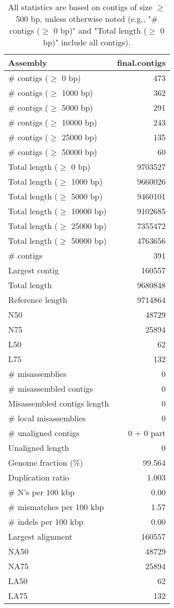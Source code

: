 \documentclass[12pt,a4paper]{article}
\begin{document}
\begin{table}[ht]
\begin{center}
\caption{All statistics are based on contigs of size $\geq$ 500 bp, unless otherwise noted (e.g., "\# contigs ($\geq$ 0 bp)" and "Total length ($\geq$ 0 bp)" include all contigs).}
\begin{tabular}{|l*{1}{|r}|}
\hline
Assembly & final.contigs \\ \hline
\# contigs ($\geq$ 0 bp) & 473 \\ \hline
\# contigs ($\geq$ 1000 bp) & 362 \\ \hline
\# contigs ($\geq$ 5000 bp) & 291 \\ \hline
\# contigs ($\geq$ 10000 bp) & 243 \\ \hline
\# contigs ($\geq$ 25000 bp) & 135 \\ \hline
\# contigs ($\geq$ 50000 bp) & 60 \\ \hline
Total length ($\geq$ 0 bp) & 9703527 \\ \hline
Total length ($\geq$ 1000 bp) & 9660026 \\ \hline
Total length ($\geq$ 5000 bp) & 9460101 \\ \hline
Total length ($\geq$ 10000 bp) & 9102685 \\ \hline
Total length ($\geq$ 25000 bp) & 7355472 \\ \hline
Total length ($\geq$ 50000 bp) & 4763656 \\ \hline
\# contigs & 391 \\ \hline
Largest contig & 160557 \\ \hline
Total length & 9680848 \\ \hline
Reference length & 9714864 \\ \hline
N50 & 48729 \\ \hline
N75 & 25894 \\ \hline
L50 & 62 \\ \hline
L75 & 132 \\ \hline
\# misassemblies & 0 \\ \hline
\# misassembled contigs & 0 \\ \hline
Misassembled contigs length & 0 \\ \hline
\# local misassemblies & 0 \\ \hline
\# unaligned contigs & 0 + 0 part \\ \hline
Unaligned length & 0 \\ \hline
Genome fraction (\%) & 99.564 \\ \hline
Duplication ratio & 1.003 \\ \hline
\# N's per 100 kbp & 0.00 \\ \hline
\# mismatches per 100 kbp & 1.57 \\ \hline
\# indels per 100 kbp & 0.00 \\ \hline
Largest alignment & 160557 \\ \hline
NA50 & 48729 \\ \hline
NA75 & 25894 \\ \hline
LA50 & 62 \\ \hline
LA75 & 132 \\ \hline
\end{tabular}
\end{center}
\end{table}
\end{document}
